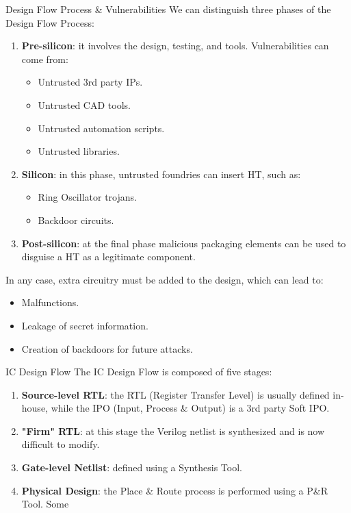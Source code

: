 \begin{section}{Design Flow Process \& Vulnerabilities}
  We can distinguish three phases of the Design Flow Process:
  \begin{enumerate}
    \item \textbf{Pre-silicon}: it involves the design, testing, and tools. Vulnerabilities can come
      from:
      \begin{itemize}
        \item Untrusted 3rd party IPs.
        \item Untrusted CAD tools.
        \item Untrusted automation scripts.
        \item Untrusted libraries.
      \end{itemize}
    \item \textbf{Silicon}: in this phase, untrusted foundries can insert HT, such as:
      \begin{itemize}
        \item Ring Oscillator trojans.
        \item Backdoor circuits.
      \end{itemize}
    \item \textbf{Post-silicon}: at the final phase malicious packaging elements can be used to
      disguise a HT as a legitimate component.
  \end{enumerate}
  In any case, extra circuitry must be added to the design, which can lead to:
  \begin{itemize}
    \item Malfunctions.
    \item Leakage of secret information.
    \item Creation of backdoors for future attacks.
  \end{itemize}
  \begin{subsection}{IC Design Flow}
    The IC Design Flow is composed of five stages:
    \begin{enumerate}
      \item \textbf{Source-level RTL}: the RTL (Register Transfer Level) is usually defined
        in-house, while the IPO (Input, Process \& Output) is a 3rd party Soft IPO.
      \item \textbf{"Firm" RTL}: at this stage the Verilog netlist is synthesized and is now
        difficult to modify.
      \item \textbf{Gate-level Netlist}: defined using a Synthesis Tool.
      \item  \textbf{Physical Design}: the Place \& Route process is performed using a P\&R Tool. Some

\end{enumerate}
\end{subsection}
\end{section}
